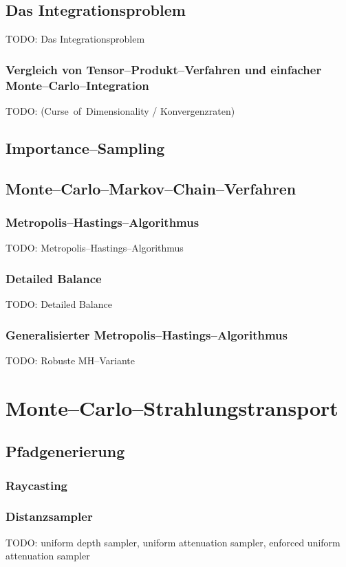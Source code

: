 \documentclass[11pt,a4paper,DIVcalc,BCOR8mm,titlepage,twoside]{scrartcl}
\begin{document}
	\subsection{Das Integrationsproblem}
	TODO: Das Integrationsproblem
	\subsubsection{Vergleich von Tensor--Produkt--Verfahren und einfacher Monte--Carlo--Integration}
	TODO: (Curse~of~Dimensionality / Konvergenzraten)
	\subsection{Importance--Sampling}

	\subsection{Monte--Carlo--Markov--Chain--Verfahren}
	\subsubsection{Metropolis--Hastings--Algorithmus}
	TODO: Metropolis--Hastings--Algorithmus
	\subsubsection{Detailed Balance}
	TODO: Detailed Balance
	\subsubsection{Generalisierter Metropolis--Hastings--Algorithmus}
	TODO: Robuste MH--Variante

	\section{Monte--Carlo--Strahlungstransport}
	\subsection{Pfadgenerierung}
	\subsubsection{Raycasting}
	\subsubsection{Distanzsampler}
	TODO: uniform depth sampler, uniform attenuation sampler, enforced uniform attenuation sampler
	
\end{document}
